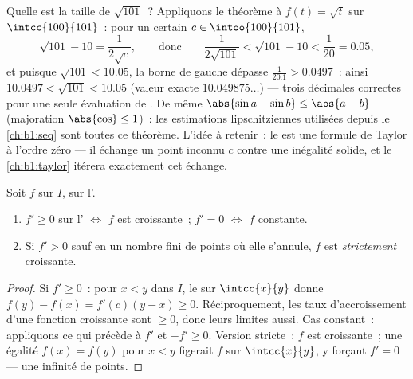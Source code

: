 \begin{example}\label{ex:b1:derivative:mvtestimate}
Quelle est la taille de $\sqrt{101}$~? Appliquons le théorème à $f(t) = \sqrt t$
sur $\intcc{100}{101}$~: pour un certain $c \in \intoo{100}{101}$,
\[
\sqrt{101} - 10 = \frac{1}{2\sqrt c},
\qquad\text{donc}\qquad
\frac{1}{2\sqrt{101}} < \sqrt{101} - 10 < \frac{1}{20} = 0.05 ,
\]
et puisque $\sqrt{101} < 10.05$, la borne de gauche dépasse
$\frac{1}{20.1} > 0.0497$~: ainsi $10.0497 < \sqrt{101} < 10.05$
(valeur exacte $10.049875\dots$) --- trois décimales correctes pour une seule
évaluation de . De même $\abs{\sin a - \sin b} \leq
\abs{a - b}$ (majoration $\abs{\cos}\leq 1$)~: les estimations
lipschitziennes utilisées depuis le \cref{ch:b1:seq} sont toutes ce théorème.
L'idée à retenir~: le  est une formule de
Taylor à l'ordre zéro --- il échange un point inconnu $c$ contre une inégalité
solide, et le \cref{ch:b1:taylor} itérera exactement cet échange.
\end{example}

\begin{corollary}\label{cor:b1:derivative:monotone}
Soit $f$  sur $I$,  sur l'.
\begin{enumerate}
  \item $f' \geq 0$ sur l' $\iff$ $f$ est croissante~; $f' = 0$
        $\iff$ $f$ constante.
  \item Si $f' > 0$ sauf en un nombre fini de points où elle s'annule,
        $f$ est \emph{strictement} croissante.
\end{enumerate}
\end{corollary}

\begin{proof}
Si $f' \geq 0$~: pour $x < y$ dans $I$, le  sur
$\intcc{x}{y}$ donne $f(y) - f(x) = f'(c)(y - x) \geq 0$. Réciproquement,
les taux d'accroissement d'une fonction croissante sont $\geq 0$, donc leurs
limites aussi. Cas constant~: appliquons ce qui précède à $f'$ et
$-f' \geq 0$. Version stricte~: $f$ est croissante~; une égalité $f(x) =
f(y)$ pour $x < y$ figerait $f$ sur $\intcc{x}{y}$, y forçant $f' =
0$ --- une infinité de points.
\end{proof}


